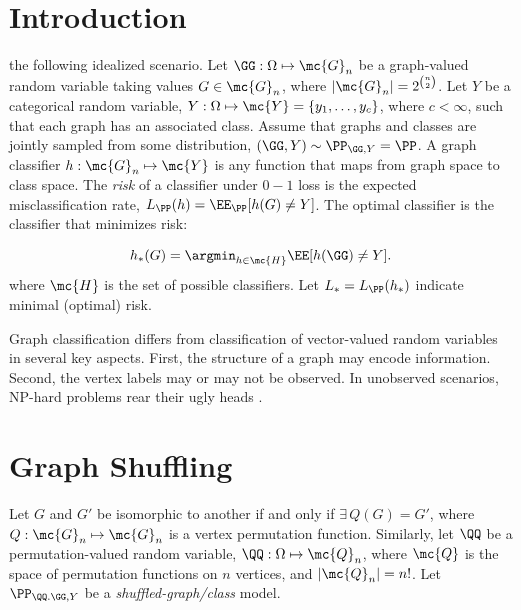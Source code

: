 \documentclass[10pt,journal,cspaper,compsoc]{IEEEtran}
\newcommand{\Qs}{Q}
\begin{document}
\maketitle
\IEEEdisplaynotcompsoctitleabstractindextext
\IEEEpeerreviewmaketitle



\section{Introduction}

  the following idealized scenario. Let $\GG: \Omega \mapsto \mc{G}_n$ be a graph-valued random variable taking values $G\in \mc{G}_n$, where $|\mc{G}_n|=2^{\binom{n}{2}}$. 
Let $Y$ be a categorical random variable, $Y: \Omega \mapsto \mc{Y}=\{y_1,\ldots, y_{c}\}$, where $c< \infty$, such that each graph has an associated class.  Assume that graphs and classes are jointly sampled from some distribution, $(\GG,Y) \sim \PP_{\GG,Y}=\PP$. A graph classifier $h: \mc{G}_n \mapsto \mc{Y}$ is any function that maps from graph space to class space.  The \emph{risk} of a classifier under $0-1$ loss is the expected misclassification rate, $L_{\PP}(h)=\EE_{\PP}[h(G)\neq Y]$.  The optimal classifier is the classifier that minimizes risk:

\begin{align}
	h_*(G) = \argmin_{h \in \mc{H}} \EE[h(\GG) \neq Y].
\end{align}
where $\mc{H}$ is the set of possible classifiers.  Let $L_*=L_{\PP}(h_*)$ indicate minimal (optimal) risk.  

Graph classification differs from classification of vector-valued random variables in several key aspects.  First, the structure of a graph may encode information.  Second, the vertex labels may or may not be observed.  In unobserved scenarios, NP-hard problems rear their ugly heads \cite{Conte2004}. 

\section{Graph Shuffling} %
\label{sec:graph_shuffling}


Let $G$ and $G'$ be isomorphic to another if and only if $\exists \, \Qs(G)=G'$, where  $\Qs: \mc{G}_n \mapsto \mc{G}_n$ is a vertex permutation function.   
Similarly, let $\QQ$ be a permutation-valued random variable, $\QQ:\Omega \mapsto \mc{Q}_n$, where $\mc{Q}$ is the space of permutation functions on $n$ vertices, and $|\mc{Q}_n|=n!$.  Let $\PP_{\QQ.\GG,Y}$ be a \emph{shuffled-graph/class} model.  
\end{document}
